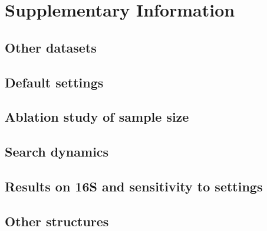 \raggedbottom
\section{Supplementary Information}\label{sec:supplement}

\subsection{Other datasets}



\noindent
\hfill

\FloatBarrier

\subsection{Default settings}



\subsection{Ablation study of sample size}


\FloatBarrier

\subsection{Search dynamics}



\FloatBarrier

\subsection{Results on 16S and sensitivity to settings}




\FloatBarrier

\subsection{Other structures}






